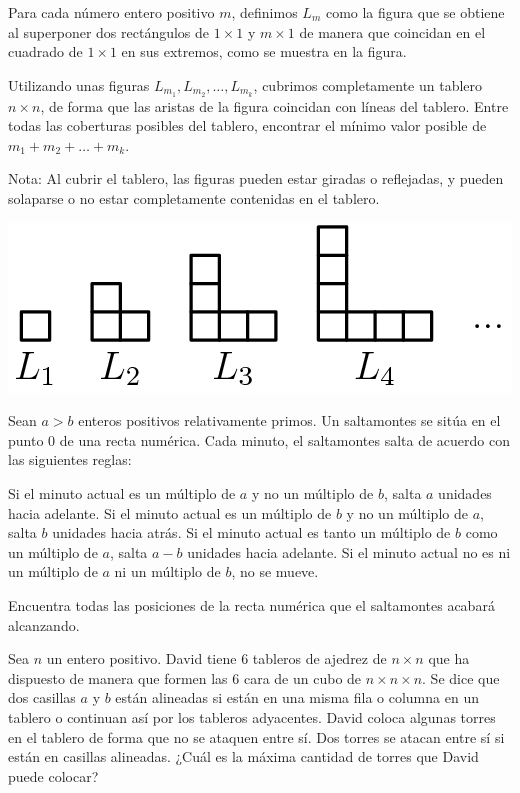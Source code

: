 \documentclass[11pt]{scrartcl}
\begin{document}
\begin{problem}
    [2018/2]
    Para cada número entero positivo $m$, definimos $L_m$ como la figura que se obtiene al superponer dos rectángulos de $1 \times 1$ y $m\times 1$ de manera que coincidan en el cuadrado de $1 \times 1$ en sus extremos, como se muestra en la figura.

Utilizando unas figuras $L_{m_1}, L_{m_2}, \dots, L_{m_k}$, cubrimos completamente un tablero $n \times n$, de forma que las aristas de la figura coincidan con líneas del tablero. Entre todas las coberturas posibles del tablero, encontrar el mínimo valor posible de $m_1 + m_2 + \dots + m_k$.

Nota: Al cubrir el tablero, las figuras pueden estar giradas o reflejadas, y pueden solaparse o no estar completamente contenidas en el tablero.
    \begin{center}
        \includegraphics[scale=0.3]{18OMM2.png}
    \end{center}
\end{problem}
\begin{problem}
    [2019/5]
    Sean $a > b$ enteros positivos relativamente primos. Un saltamontes se sitúa en el punto $0$ de una recta numérica. Cada minuto, el saltamontes salta de acuerdo con las siguientes reglas:

    Si el minuto actual es un múltiplo de $a$ y no un múltiplo de $b$, salta $a$ unidades hacia adelante.
    Si el minuto actual es un múltiplo de $b$ y no un múltiplo de $a$, salta $b$ unidades hacia atrás.
    Si el minuto actual es tanto un múltiplo de $b$ como un múltiplo de $a$, salta $a - b$ unidades hacia adelante.
    Si el minuto actual no es ni un múltiplo de $a$ ni un múltiplo de $b$, no se mueve.

Encuentra todas las posiciones de la recta numérica que el saltamontes acabará alcanzando.

\end{problem}
\begin{problem}
    [2022/2] 
    Sea $n$ un entero positivo. David tiene $6$ tableros de ajedrez de $n\times n$ que ha dispuesto de manera que formen las $6$ cara de un cubo de $n\times n\times n$. Se dice que dos casillas $a$ y $b$ están alineadas si están en una misma fila o columna en un tablero o continuan así por los tableros adyacentes. David coloca algunas torres en el tablero de forma que no se ataquen entre sí. Dos torres se atacan entre sí si están en casillas alineadas. ¿Cuál es la máxima cantidad de torres que David puede colocar?
\end{problem}
\end{document}
